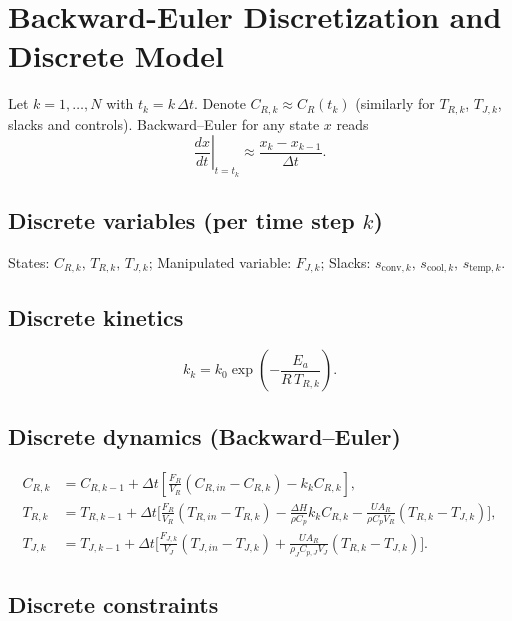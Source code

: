 \documentclass[11pt]{article}
\begin{document}
\section{Backward-Euler Discretization and Discrete Model} \label{sec:discretization}
Let $k=1,\dots,N$ with $t_k = k\,\Delta t$. Denote $C_{R,k}\approx C_R(t_k)$ (similarly for $T_{R,k}$, $T_{J,k}$, slacks and controls). Backward–Euler for any state $x$ reads
\begin{equation}
    \left.\frac{dx}{dt}\right|_{t=t_k} \approx \frac{x_k - x_{k-1}}{\Delta t}.
\end{equation}

\subsection{Discrete variables (per time step $k$)}
States: $C_{R,k},\,T_{R,k},\,T_{J,k}$; Manipulated variable: $F_{J,k}$; Slacks: $s_{\mathrm{conv},k},\,s_{\mathrm{cool},k},\,s_{\mathrm{temp},k}$.

\subsection{Discrete kinetics}
\begin{equation}
    k_k = k_0 \exp\!\left(-\frac{E_a}{R\,T_{R,k}}\right).
\end{equation}

\subsection{Discrete dynamics (Backward–Euler)}
\begin{align}
    C_{R,k} &= C_{R,k-1} + \Delta t \left[\frac{F_R}{V_R}(C_{R,in} - C_{R,k}) - k_k C_{R,k}\right], \\
    T_{R,k} &= T_{R,k-1} + \Delta t \Big[
        \frac{F_R}{V_R}(T_{R,in} - T_{R,k})
        - \frac{\Delta H}{\rho C_p} k_k C_{R,k}
        - \frac{U A_R}{\rho C_p V_R}(T_{R,k} - T_{J,k})
    \Big],\\
    T_{J,k} &= T_{J,k-1} + \Delta t \Big[
        \frac{F_{J,k}}{V_J}(T_{J,in} - T_{J,k})
        + \frac{U A_R}{\rho_J C_{p,J} V_J}(T_{R,k} - T_{J,k})
    \Big].
\end{align}

\subsection{Discrete constraints}
\end{document}
